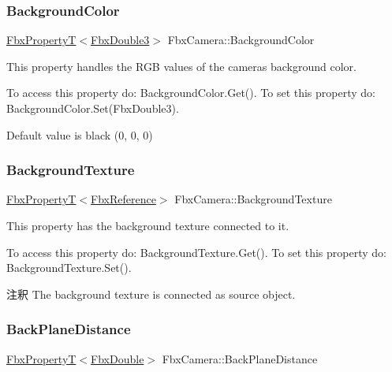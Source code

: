 \subsubsection{\texorpdfstring{Background\+Color}{BackgroundColor}}
{\footnotesize\ttfamily \hyperlink{class_fbx_property_t}{Fbx\+PropertyT}$<$\hyperlink{fbxtypes_8h_ae0a96f14cde566774c7553aa7523b7a7}{Fbx\+Double3}$>$ Fbx\+Camera\+::\+Background\+Color}

This property handles the R\+GB values of the camera\textquotesingle{}s background color.

To access this property do\+: Background\+Color.\+Get(). To set this property do\+: Background\+Color.\+Set(\+Fbx\+Double3).

Default value is black (0, 0, 0) \mbox{\label{class_fbx_camera_a23d1fddeed7661a66461fbe0f27cedde}} 
\subsubsection{\texorpdfstring{Background\+Texture}{BackgroundTexture}}
{\footnotesize\ttfamily \hyperlink{class_fbx_property_t}{Fbx\+PropertyT}$<$\hyperlink{fbxtypes_8h_a44df6a2eec915cf27cd481e5c5e48a24}{Fbx\+Reference}$>$ Fbx\+Camera\+::\+Background\+Texture}

This property has the background texture connected to it.

To access this property do\+: Background\+Texture.\+Get(). To set this property do\+: Background\+Texture.\+Set().

\begin{DoxyRemark}{注釈}
The background texture is connected as source object. 
\end{DoxyRemark}
\mbox{\label{class_fbx_camera_ad54b41219ffef6383e75197300210f75}} 
\subsubsection{\texorpdfstring{Back\+Plane\+Distance}{BackPlaneDistance}}
{\footnotesize\ttfamily \hyperlink{class_fbx_property_t}{Fbx\+PropertyT}$<$\hyperlink{fbxtypes_8h_a171e72a1c46fc15c1a6c9c31948c1c5b}{Fbx\+Double}$>$ Fbx\+Camera\+::\+Back\+Plane\+Distance}

